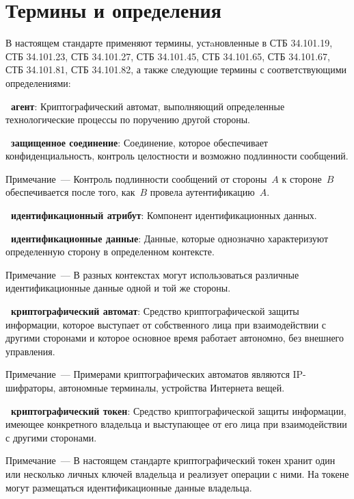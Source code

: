 \chapter{Термины и определения}

В настоящем стандарте применяют термины, устaновленные в СТБ 34.101.19,
СТБ 34.101.23, СТБ 34.101.27, СТБ 34.101.45, СТБ 34.101.65, 
СТБ 34.101.67, СТБ 34.101.81, СТБ 34.101.82, а также следующие термины с 
соответствующими определениями:

{\bf \thedefctr~агент}:
Криптографический автомат, выполняющий определенные технологические 
процессы по поручению другой стороны.

{\bf \thedefctr~защищенное соединение}:
Соединение, которое обеспечивает конфиденциальность, 
контроль целостности и возможно подлинности сообщений. 

\begin{note}
Примечание~--- Контроль подлинности сообщений от стороны~$A$ к стороне~$B$ 
обеспечивается после того, как~$B$ провела аутентификацию~$A$.
\end{note}

{\bf \thedefctr~идентификационный атрибут}:
Компонент идентификационных данных. 

{\bf \thedefctr~идентификационные данные}:
Данные, которые однозначно характеризуют определенную 
сторону в определенном контексте. 

\begin{note}
Примечание~--- В разных контекстах могут использоваться 
различные идентификационные данные одной и той же стороны.
\end{note}

{\bf\thedefctr~криптографический автомат}: 
Средство криптографической защиты информации, которое выступает от 
собственного лица при взаимодействии с другими сторонами
и которое основное время работает автономно, без внешнего управления.

\begin{note}
Примечание~--- 
Примерами криптографических автоматов являются IP-шифраторы, 
автономные терминалы, устройства Интернета вещей.
\end{note}

{\bf\thedefctr~криптографический токен}: 
Средство криптографической защиты информации, имеющее конкретного 
владельца и выступающее от его лица при взаимодействии с другими 
сторонами. 
%
\begin{note}
Примечание~--- В настоящем стандарте криптографический токен хранит один 
или несколько личных ключей владельца и реализует операции с ними.  
%
На токене могут размещаться идентификационные данные владельца. 
\end{note}

